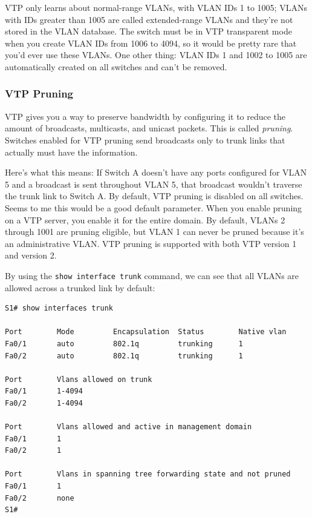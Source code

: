 VTP only learns about normal-range VLANs, with VLAN IDs 1 to 1005; VLANs
with IDs greater than 1005 are called extended-range VLANs and they're
not stored in the VLAN database. The switch must be in VTP transparent
mode when you create VLAN IDs from 1006 to 4094, so it would be pretty
rare that you'd ever use these VLANs. One other thing: VLAN IDs 1 and
1002 to 1005 are automatically created on all switches and can't be
removed.

\subsubsection[VTP
Pruning]{\texorpdfstring{\protect\hypertarget{c15.xhtmlux5cux23c15-sec-6}{}{}VTP
Pruning}{VTP Pruning}}

VTP gives you a way to preserve bandwidth by configuring it to reduce
the amount of broadcasts, multicasts, and unicast packets. This is
called \emph{pruning}. Switches enabled for VTP pruning send broadcasts
only to trunk links that actually must have the information.

Here's what this means: If Switch A doesn't have any ports configured
for VLAN 5 and a broadcast is sent throughout VLAN 5, that broadcast
wouldn't traverse the trunk link to Switch A. By default, VTP pruning is
disabled on all switches. Seems to me this would be a good default
parameter. When you enable pruning on a VTP server, you enable it for
the entire domain. By default, VLANs 2 through 1001 are pruning
eligible, but VLAN 1 can never be pruned because it's an administrative
VLAN. VTP pruning is supported with both VTP version 1 and version 2.

By using the \texttt{show\ interface\ trunk} command, we can see that
all VLANs are allowed across a trunked link by default:

\begin{verbatim}
S1# show interfaces trunk

Port        Mode         Encapsulation  Status        Native vlan
Fa0/1       auto         802.1q         trunking      1
Fa0/2       auto         802.1q         trunking      1

Port        Vlans allowed on trunk
Fa0/1       1-4094
Fa0/2       1-4094

Port        Vlans allowed and active in management domain
Fa0/1       1
Fa0/2       1

Port        Vlans in spanning tree forwarding state and not pruned
Fa0/1       1
Fa0/2       none
S1#
\end{verbatim}

